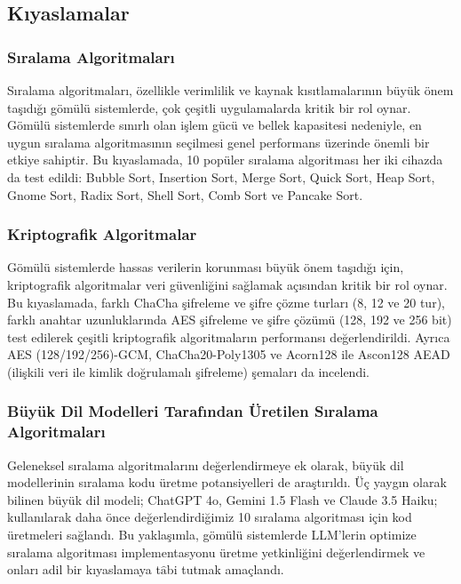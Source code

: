 \documentclass[conference, a4paper]{IEEEtran}
\begin{document}
\subsection{Kıyaslamalar}

\subsubsection{Sıralama Algoritmaları}

Sıralama algoritmaları, özellikle verimlilik ve kaynak kısıtlamalarının büyük önem taşıdığı gömülü sistemlerde, çok çeşitli uygulamalarda kritik bir rol oynar. Gömülü sistemlerde sınırlı olan işlem gücü ve bellek kapasitesi nedeniyle, en uygun sıralama algoritmasının seçilmesi genel performans üzerinde önemli bir etkiye sahiptir. Bu kıyaslamada, 10 popüler sıralama algoritması her iki cihazda da test edildi: Bubble Sort, Insertion Sort, Merge Sort, Quick Sort, Heap Sort, Gnome Sort, Radix Sort, Shell Sort, Comb Sort ve Pancake Sort.

\subsubsection{Kriptografik Algoritmalar}

Gömülü sistemlerde hassas verilerin korunması büyük önem taşıdığı için, kriptografik algoritmalar veri güvenliğini sağlamak açısından kritik bir rol oynar. Bu kıyaslamada, farklı ChaCha şifreleme ve şifre çözme turları (8, 12 ve 20 tur), farklı anahtar uzunluklarında AES şifreleme ve şifre çözümü (128, 192 ve 256 bit) test edilerek çeşitli kriptografik algoritmaların performansı değerlendirildi. Ayrıca AES (128/192/256)-GCM, ChaCha20-Poly1305 ve Acorn128 ile Ascon128 AEAD (ilişkili veri ile kimlik doğrulamalı şifreleme) şemaları da incelendi.

\subsubsection{Büyük Dil Modelleri Tarafından Üretilen Sıralama Algoritmaları}

Geleneksel sıralama algoritmalarını değerlendirmeye ek olarak, büyük dil modellerinin sıralama kodu üretme potansiyelleri de araştırıldı. Üç yaygın olarak bilinen büyük dil modeli; ChatGPT 4o, Gemini 1.5 Flash ve Claude 3.5 Haiku; kullanılarak daha önce değerlendirdiğimiz 10 sıralama algoritması için kod üretmeleri sağlandı. Bu yaklaşımla, gömülü sistemlerde LLM'lerin optimize sıralama algoritması implementasyonu üretme yetkinliğini değerlendirmek ve onları adil bir kıyaslamaya t$\hat{\text{a}}$bi tutmak amaçlandı.
\end{document}
